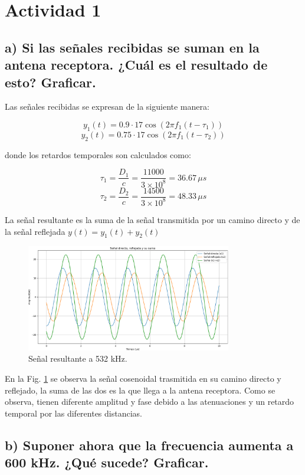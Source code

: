 \section{Actividad 1}

\subsection*{a) Si las señales recibidas se suman en la antena receptora. ¿Cuál es el resultado de esto? Graficar. }

Las señales recibidas se expresan de la siguiente manera:

    \[
        y_1(t) = 0.9 \cdot 17 \cos(2\pi f_1 (t - \tau_1))
        \]
        \[
        y_2(t) = 0.75 \cdot 17 \cos(2\pi f_1 (t - \tau_2))
    \]

donde los retardos temporales son calculados como:

    \[
        \tau_1 = \frac{D_1}{c} = \frac{11000}{3 \times 10^8} = 36.67 \, \mu s
        \]
        \[
        \tau_2 = \frac{D_2}{c} = \frac{14500}{3 \times 10^8} = 48.33 \, \mu s
    \]

La señal resultante es la suma de la señal transmitida por un camino directo y de la señal reflejada \(y(t) = y_1(t) + y_2(t)\) 
\bigskip


\begin{figure}[H]
    \centering
        \includegraphics[width=0.8\textwidth]{imagenes/Actividad_1/grafico_532kHz.png}
        \caption{Señal resultante a 532 kHz.}
        \label{fig:532kHz}
    \end{figure}
\bigskip

En la Fig. \ref{fig:532kHz} se observa la señal cosenoidal trasmitida en su camino directo y reflejado, la suma de las dos es la que 
llega a la antena receptora. Como se observa, tienen diferente amplitud y fase debido a las atenuaciones y un retardo temporal por las 
diferentes distancias.
\bigskip

\subsection*{b) Suponer ahora que la frecuencia aumenta a 600 kHz. ¿Qué sucede? Graficar. }

